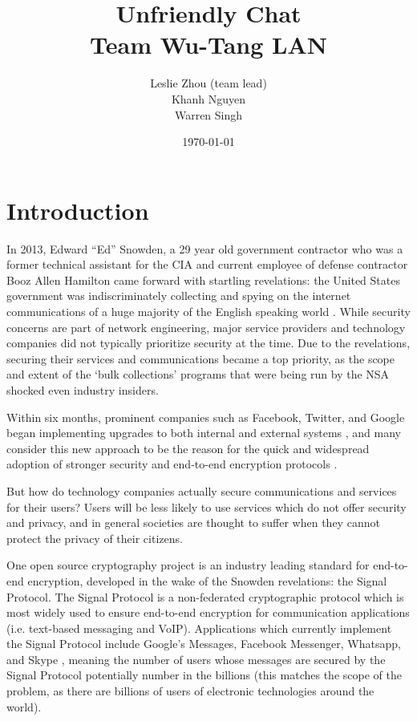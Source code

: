 \documentclass[12pt]{article}
\title{%
    Unfriendly Chat\\
    \large Team Wu-Tang LAN}
\author{Leslie Zhou (team lead)\\ Khanh Nguyen \\ Warren Singh}
\date{\today}
\begin{document}
\maketitle

\newpage
\tableofcontents
\newpage

\section{Introduction}
In 2013, Edward “Ed” Snowden, a 29 year old government contractor who was a former technical assistant for the CIA and current employee of defense contractor Booz Allen Hamilton came forward with startling revelations: the United States government was indiscriminately collecting and spying on the internet communications of a huge majority of the English speaking world \parencite{website:snowden}. While security concerns are part of network engineering, major service providers and technology companies did not typically prioritize security at the time. Due to the revelations, securing their services and communications became a top priority, as the scope and extent of the ‘bulk collections’ programs that were being run by the NSA shocked even industry insiders.
\par Within six months, prominent companies such as Facebook, Twitter, and Google began implementing upgrades to both internal and external systems \parencite{website:nytimes}, and many consider this new approach to be the reason for the quick and widespread adoption of stronger security and end-to-end encryption protocols \parencite{website:newsweek}. 

\par %
But how do technology companies actually secure communications and services for their users? Users will be less likely to use services which do not offer security and privacy, and in general societies are thought to suffer when they cannot protect the privacy of their citizens. 
\par One open source cryptography project \parencite{website:open-source} is an industry leading standard \parencite{website:signal-widespread} for end-to-end encryption, developed in the wake of the Snowden revelations: the Signal Protocol. The Signal Protocol \parencite{website:signal-docs} is a non-federated cryptographic protocol which is most widely used to ensure end-to-end encryption for communication applications (i.e. text-based messaging and VoIP). Applications which currently implement the Signal Protocol include Google’s Messages, Facebook Messenger, Whatsapp, and Skype \parencite{website:signal-widespread}, meaning the number of users whose messages are secured by the Signal Protocol potentially number in the billions (this matches the scope of the problem, as there are billions of users of electronic technologies around the world).
\end{document}
